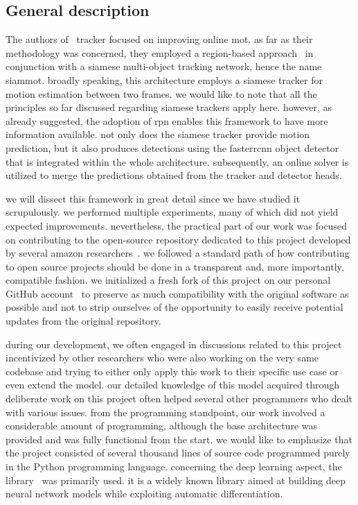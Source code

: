 
\subsection{General description}

The authors of~\cite{shuai2021siammot} tracker focused on improving online \gls{mot}. as far as their methodology was concerned, they employed a region-based approach~\cite{ren2017fasterrcnn} in conjunction with a siamese multi-object tracking network, hence the name \gls{siammot}. broadly speaking, this architecture employs a siamese tracker for motion estimation between two frames. we would like to note that all the principles so far discussed regarding siamese trackers apply here. however, as already suggested, the adoption of \gls{rpn} enables this framework to have more information available. not only does the siamese tracker provide motion prediction, but it also produces detections using the \gls{fasterrcnn} object detector~\cite{ren2017fasterrcnn} that is integrated within the whole architecture. subsequently, an online solver is utilized to merge the predictions obtained from the tracker and detector heads.

we will dissect this framework in great detail since we have studied it scrupulously. we performed multiple experiments, many of which did not yield expected improvements. nevertheless, the practical part of our work was focused on contributing to the open-source repository dedicated to this project developed by several amazon researchers~\cite{websiammotoriggithub}. we followed a standard path of how contributing to open source projects should be done in a transparent and, more importantly, compatible fashion. we initialized a fresh fork of this project on our personal GitHub account~\cite{websiammotforkgithub} to preserve as much compatibility with the original software as possible and not to strip ourselves of the opportunity to easily receive potential updates from the original repository.

during our development, we often engaged in discussions related to this project incentivized by other researchers who were also working on the very same codebase and trying to either only apply this work to their specific use case or even extend the model. our detailed knowledge of this model acquired through deliberate work on this project often helped several other programmers who dealt with various issues. from the programming standpoint, our work involved a considerable amount of programming, although the base architecture was provided and was fully functional from the start. we would like to emphasize that the project consisted of several thousand lines of source code programmed purely in the Python programming language. concerning the deep learning aspect, the \pytorch{} library~\cite{paszke2019pytorch} was primarily used. it is a widely known library aimed at building deep neural network models while exploiting automatic differentiation.

